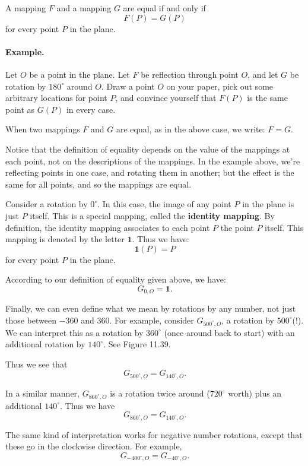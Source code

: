 \documentclass[12pt]{book} %
\begin{document}
\begin{ExerciseList}
A mapping $F$ and a mapping $G$ are equal if and only if
\[
F(P)=G(P)
\]
for every point $P$ in the plane.

\paragraph{Example.}
Let $O$ be a point in the plane. Let $F$ be reflection through
point $O$, and let $G$ be rotation by $180^\circ$ around $O$. Draw a point
$O$ on your paper, pick out some arbitrary locations for point $P$, and convince
yourself that $F(P)$ is the same point as $G(P)$ in every case.

When two mappings $F$ and $G$ are equal, as in the above case, we
write: $F=G$.

Notice that the definition of equality depends on the value of the
mappings at each point, not on the descriptions of the mappings. In the
example above, we're reflecting points in one case, and rotating them in
another; but the effect is the same for all points, and so the mappings
are equal.

Consider a rotation by $0^\circ$. In this case, the image of any point $P$ in
the plane is just $P$ itself. This is a special mapping, called the \textbf{identity
mapping}. By definition, the identity mapping associates to each point $P$
the point $P$ itself. This mapping is denoted by the letter $\mathbf{1}$. Thus we
have:
\[
\mathbf{1}(P)=P
\]
for every point $P$ in the plane.

According to our definition of equality given above, we have:
\[
G_{0,O}=\mathbf{1}.
\]

Finally, we can even define what we mean by rotations by any
number, not just those between $-360$ and $360$. For example, consider
$G_{500^\circ,O}$, a rotation by $500^\circ$(!). We can interpret this as a rotation by $360^\circ$
(once around back to start) with an additional rotation by $140^\circ$. See
Figure 11.39.


Thus we see that
\[
G_{500^\circ,O}=G_{140^\circ,O}.
\]

In a similar manner, $G_{860^\circ,O}$ is a rotation twice around ($720^\circ$ worth) plus
an additional $140^\circ$. Thus we have
\[
G_{860^\circ,O}=G_{140^\circ,O}.
\]

The same kind of interpretation works for negative number rotations,
except that these go in the clockwise direction. For example,
\[
G_{-400^\circ,O}=G_{-40^\circ,O}.
\]


\end{ExerciseList}
\end{document}
